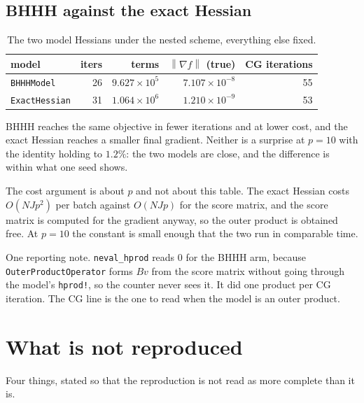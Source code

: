 \documentclass[11pt,a4paper]{article}
\providecommand{\norm}[1]{\left \lVert #1 \right \rVert}
\begin{document}
\subsection{BHHH against the exact Hessian}
\label{sec:models}

\begin{table}[H]
\centering
\caption{The two model Hessians under the nested scheme, everything else fixed.}
\begin{tabular}{lrrrr}
\toprule
model & iters & terms & $\norm{\nabla f}$ (true) & CG iterations \\
\midrule
\texttt{BHHHModel}    & 26 & $9.627\times10^{5}$ & $7.107\times10^{-8}$ & 55 \\
\texttt{ExactHessian} & 31 & $1.064\times10^{6}$ & $1.210\times10^{-9}$ & 53 \\
\bottomrule
\end{tabular}
\end{table}

BHHH reaches the same objective in fewer iterations and at lower cost, and the exact
Hessian reaches a smaller final gradient. Neither is a surprise at $p = 10$ with the
identity holding to $1.2\%$: the two models are close, and the difference is within
what one seed shows.

The cost argument is about $p$ and not about this table. The exact Hessian costs
$O(NJp^2)$ per batch against $O(NJp)$ for the score matrix, and the score matrix is
computed for the gradient anyway, so the outer product is obtained free. At $p = 10$
the constant is small enough that the two run in comparable time.

One reporting note. \texttt{neval\_hprod} reads $0$ for the BHHH arm, because
\texttt{OuterProductOperator} forms $Bv$ from the score matrix without going through
the model's \texttt{hprod!}, so the counter never sees it. It did one product per CG
iteration. The CG line is the one to read when the model is an outer product.

\section{What is not reproduced}

Four things, stated so that the reproduction is not read as more complete than it is.
\end{document}
